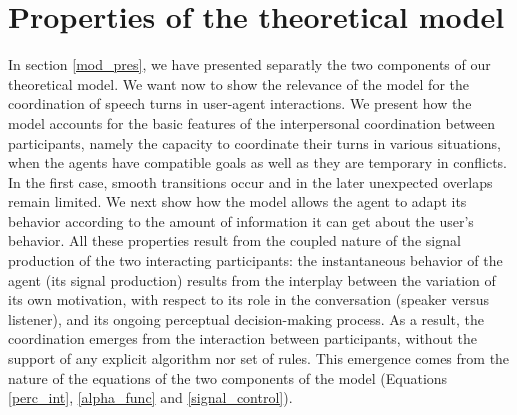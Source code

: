 \section{Properties of the theoretical model}
\label{mod_analysis}

In section \ref{mod_pres}, we have presented separatly the two components of our theoretical model. 
We want now to show the relevance of the model for the coordination of speech turns in user-agent interactions.
We present how the model accounts for the basic features of the interpersonal coordination between participants, namely the capacity to coordinate their turns in various situations, when the agents have compatible goals as well as they are temporary in conflicts. In the first case, smooth transitions occur and in the later unexpected overlaps remain limited.
We next show how the model allows the agent to adapt its behavior according to the amount of information it can get about the user's behavior.
All these properties result from the coupled nature of the signal production of the two interacting participants: the instantaneous behavior of the agent (its signal production) results from the interplay between the variation of its own motivation, with respect to its role in the conversation (speaker versus listener), and its ongoing perceptual decision-making process. 
As a result, the coordination emerges from the interaction between participants, without the support of any explicit algorithm nor set of rules.
This emergence comes from the nature of the equations of the two components of the model (Equations \ref{perc_int}, \ref{alpha_func} and \ref{signal_control}). 


